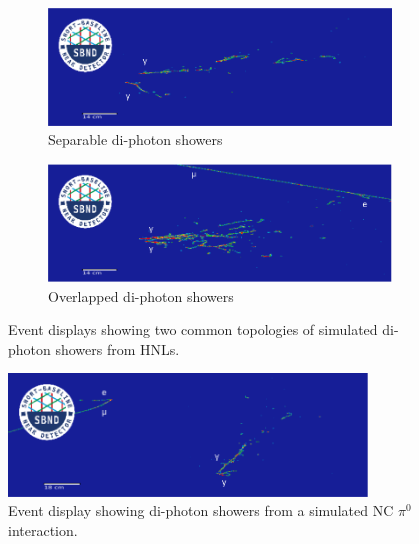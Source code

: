 \begin{figure}[ht!]
	\centering
        \begin{subfigure}[b]{0.85\textwidth}  
            \centering 
            \includegraphics[width=\textwidth]{hnl_2shw}
            \caption{Separable di-photon showers}%
	    \label{fig:hnl_evd_1shw}
        \end{subfigure}
        \centering
        \begin{subfigure}[b]{0.85\textwidth}   
            \centering 
            \includegraphics[width=\textwidth]{hnl_1shw}
            \caption{Overlapped di-photon showers}%
	    \label{fig:hnl_evd_2shw}
	\end{subfigure}
	\caption[Event Display of Di-Photon Showers From Heavy Neutral Leptons]{
	Event displays showing two common topologies of simulated di-photon showers from HNLs. 
	}
        \label{fig:hnl_evd_select}
\vspace{0.5cm}
	\centering
        \includegraphics[width=0.85\textwidth]{ncpi0}
        \caption[Event Display of a Neutral Current Interaction Containing a Neutral]{
		Event display showing di-photon showers from a simulated NC $\pi^0$ interaction. 
	}
	\label{fig:ncpi0_evd}
\end{figure}

